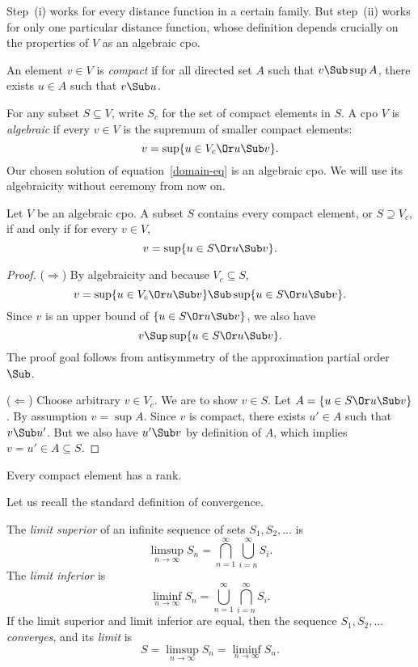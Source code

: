 Step~(i) works for every distance function in a certain family.
But step~(ii) works for only one particular distance function,
whose definition depends crucially on the properties of $V$ as an
algebraic cpo.


An element $v\in V$ is \emph{compact} if for all directed set $A$
such that $v\Sub\sup A$, there exists $u\in A$ such that $v\Sub
u$.

For any subset $S\subseteq V$, write $S_c$ for the set of compact
elements in $S$. A cpo $V$ is \emph{algebraic} if every $v\in V$
is the supremum of smaller compact elements:
\[
v=\sup \{u \in V_c \Or u \Sub v \}.
\]
Our chosen solution of equation~\eqref{domain-eq} is an algebraic
cpo. We will use its algebraicity without ceremony from now on.

\begin{lemma}
Let $V$ be an algebraic cpo. A subset $S$ contains every compact
element, or $S\supseteq V_c$, if and only if for every $v\in V$,
\[
v=\sup\{u\in S \Or u\Sub v\}.
\]
\end{lemma}

\begin{proof}
($\Rightarrow$) By algebraicity and because $V_c\subseteq S$,
\[
v=\sup\{u\in V_c \Or u \Sub v\} \Sub \sup\{u\in S \Or u \Sub v\}.
\]
Since $v$ is an upper bound of $\{u\in S \Or u \Sub v\}$, we also
have
\[
v\Sup \sup\{u\in S \Or u \Sub v\}.
\]
The proof goal follows from antisymmetry of the approximation
partial order $\Sub$.

($\Leftarrow$) Choose arbitrary $v\in V_c$. We are to show $v\in
S$. Let $A= \{u \in S \Or u \Sub v\}$. By assumption $v=\sup A$.
Since $v$ is compact, there exists $u'\in A$ such that $v\Sub
u'$. But we also have $u'\Sub v$ by definition of $A$, which
implies $v=u'\in A\subseteq S$.
\end{proof}


\begin{lemma}
Every compact element has a rank.
\end{lemma}

Let us recall the standard definition of convergence.

The \emph{limit superior} of an infinite sequence of sets
$S_1,S_2,\ldots$ is
\[
\limsup_{n\rightarrow\infty}S_n =
\bigcap_{n=1}^\infty\bigcup_{i = n}^\infty S_i.
\]
The \emph{limit inferior} is
\[
\liminf_{n\rightarrow\infty}S_n =
\bigcup_{n=1}^\infty\bigcap_{i = n}^\infty S_i.
\]
If the limit superior and limit inferior are equal, then the
sequence $S_1,S_2,\ldots$ \emph{converges}, and its \emph{limit}
is
\[
S = \limsup_{n\rightarrow\infty}S_n = \liminf_{n\rightarrow\infty}S_n.
\]

